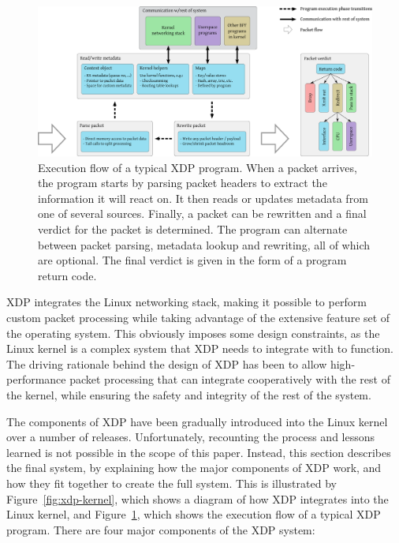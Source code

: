 \documentclass[sigconf]{acmart}
\begin{document}
\begin{figure}[t]
\centering
\includegraphics[width=\linewidth]{figures/xdp-execution-diagram.pdf}
\caption{\label{fig:xdp-execution} Execution flow of a typical XDP program. When
  a packet arrives, the program starts by parsing packet headers to extract the
  information it will react on. It then reads or updates metadata from one of
  several sources. Finally, a packet can be rewritten and a final verdict for
  the packet is determined. The program can alternate between packet parsing,
  metadata lookup and rewriting, all of which are optional. The final verdict is
  given in the form of a program return code.}
\end{figure}



XDP integrates the Linux networking stack, making it possible to perform custom
packet processing while taking advantage of the extensive feature set of the
operating system. This obviously imposes some design constraints, as the Linux
kernel is a complex system that XDP needs to integrate with to function. The
driving rationale behind the design of XDP has been to allow high-performance
packet processing that can integrate cooperatively with the rest of the kernel,
while ensuring the safety and integrity of the rest of the system.

The components of XDP have been gradually introduced into the Linux kernel over
a number of releases. Unfortunately, recounting the process and lessons learned
is not possible in the scope of this paper. Instead, this section describes the
final system, by explaining how the major components of XDP work, and how they
fit together to create the full system. This is illustrated by
Figure~\ref{fig:xdp-kernel}, which shows a diagram of how XDP integrates into
the Linux kernel, and Figure~\ref{fig:xdp-execution}, which shows the execution
flow of a typical XDP program. There are four major components of the XDP
system:
\end{document}
